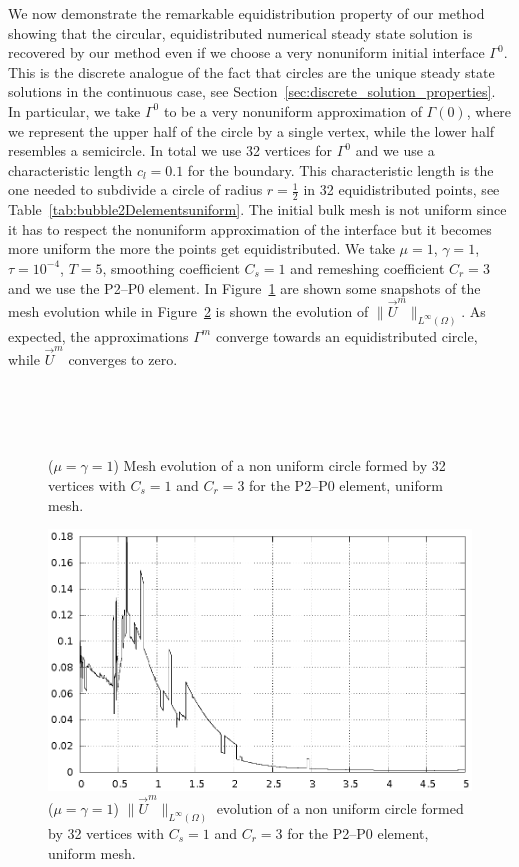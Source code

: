 \documentclass[a4paper,12pt,onecolumn]{article}
\begin{document}
We now demonstrate the remarkable equidistribution property of our method showing that the circular, equidistributed numerical steady state solution is recovered by our method even if we choose a very nonuniform initial interface $\Gamma^0$. This is the discrete analogue of the fact that circles are the unique steady state solutions in the continuous case, see Section~\ref{sec:discrete_solution_properties}. In particular, we take $\Gamma^0$ to be a very nonuniform approximation of $\Gamma(0)$, where we represent the upper half of the circle by a single vertex, while the lower half resembles a semicircle. In total we use 32 vertices for $\Gamma^0$ and we use a characteristic length $c_l=0.1$ for the boundary. This characteristic length is the one needed to subdivide a circle of radius $r=\frac{1}{2}$ in 32 equidistributed points, see Table~\ref{tab:bubble2Delementsuniform}. The initial bulk mesh is not uniform since it has to respect the nonuniform approximation of the interface but it becomes more uniform the more the points get equidistributed. We take $\mu=1$, $\gamma=1$, $\tau=10^{-4}$, $T=5$, smoothing coefficient $C_s=1$ and remeshing coefficient $C_r=3$ and we use the P2--P0 element. In Figure~\ref{fig:nonuniform_bubble_32_both} are shown some snapshots of the mesh evolution while in Figure~\ref{fig:nonuniform_bubble_velocity_32_both} is shown the evolution of $\|\vec U^m\|_{L^\infty(\Omega)}$. As expected, the approximations $\Gamma^m$ converge towards an equidistributed circle, while $\vec U^m$ converges to zero.
\begin{figure}[htbp]
  \centering
  \\
  \quad
  \\
  \quad
  \\
  \caption{($\mu=\gamma=1$) Mesh evolution of a non uniform circle formed by 32 vertices with $C_s=1$ and $C_r=3$ for the P2--P0 element, uniform mesh.}
  \label{fig:nonuniform_bubble_32_both}
\end{figure}

\begin{figure}[htbp]
  \centering
  \includegraphics[width=.45\textwidth]{figures/nonuniform_bubble_velocity_32_both.ps}
  \caption{($\mu=\gamma=1$) $\|\vec U^m\|_{L^\infty(\Omega)}$ evolution of a non uniform circle formed by 32 vertices with $C_s=1$ and $C_r=3$ for the P2--P0 element, uniform mesh.}
  \label{fig:nonuniform_bubble_velocity_32_both}
\end{figure}
\end{document}
